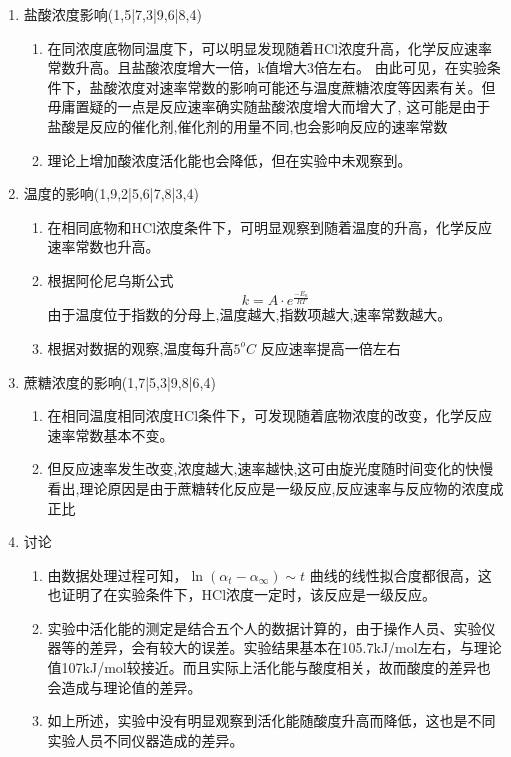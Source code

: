 \documentclass[11pt]{report}
\begin{document}
\begin{enumerate}
\begin{enumerate}
\item 盐酸浓度影响(1,5|7,3|9,6|8,4)
\label{sec:org5cf5993}
\begin{enumerate}
\item 在同浓度底物同温度下，可以明显发现随着HCl浓度升高，化学反应速率常数升高。且盐酸浓度增大一倍，k值增大3倍左右。
由此可见，在实验条件下，盐酸浓度对速率常数的影响可能还与温度蔗糖浓度等因素有关。但毋庸置疑的一点是反应速率确实随盐酸浓度增大而增大了, 这可能是由于盐酸是反应的催化剂,催化剂的用量不同,也会影响反应的速率常数
\item 理论上增加酸浓度活化能也会降低，但在实验中未观察到。
\end{enumerate}
\item 温度的影响(1,9,2|5,6|7,8|3,4)
\label{sec:org608296a}
\begin{enumerate}
\item 在相同底物和HCl浓度条件下，可明显观察到随着温度的升高，化学反应速率常数也升高。
\item 根据阿伦尼乌斯公式
\[
	 k=A\cdot e^{\frac{-E_{a}}{RT}}
	 \]
由于温度位于指数的分母上,温度越大,指数项越大,速率常数越大。
\item 根据对数据的观察,温度每升高\(5^{o}C\) 反应速率提高一倍左右
\end{enumerate}
\item 蔗糖浓度的影响(1,7|5,3|9,8|6,4)
\label{sec:org84ada07}
\begin{enumerate}
\item 在相同温度相同浓度HCl条件下，可发现随着底物浓度的改变，化学反应速率常数基本不变。
\item 但反应速率发生改变,浓度越大,速率越快,这可由旋光度随时间变化的快慢看出,理论原因是由于蔗糖转化反应是一级反应,反应速率与反应物的浓度成正比
\end{enumerate}
\item 讨论
\label{sec:orgf188429}
\begin{enumerate}
\item 由数据处理过程可知，\(\ln(\alpha_{t}-\alpha_{\infty})\sim t\) 曲线的线性拟合度都很高，这也证明了在实验条件下，HCl浓度一定时，该反应是一级反应。
\item 实验中活化能的测定是结合五个人的数据计算的，由于操作人员、实验仪器等的差异，会有较大的误差。实验结果基本在105.7kJ/mol左右，与理论值107kJ/mol较接近。而且实际上活化能与酸度相关，故而酸度的差异也会造成与理论值的差异。
\item 如上所述，实验中没有明显观察到活化能随酸度升高而降低，这也是不同实验人员不同仪器造成的差异。
\end{enumerate}
\end{enumerate}
\end{enumerate}
\end{document}
